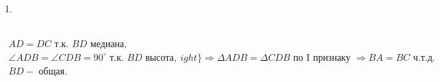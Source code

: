 1. \begin{figure}[ht!]
\end{figure}\\
$\left.\begin{array}{l}AD=DC\text{ т.к. }BD\text{ медиана,}\\
\angle ADB=\angle CDB=90^\circ \text{ т.к. }BD\text{ высота,}\\
BD - \text{ общая.}   \end{array}
ight\}\Rightarrow
\Delta ADB=\Delta CDB\text{ по I признаку }\Rightarrow BA=BC\text{ ч.т.д.} $\\
